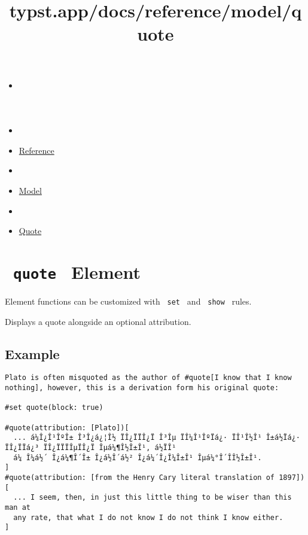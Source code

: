\title{typst.app/docs/reference/model/quote}

\begin{itemize}
\tightlist
\item
  \href{/docs}{}
\item
  
\item
  \href{/docs/reference/}{Reference}
\item
  
\item
  \href{/docs/reference/model/}{Model}
\item
  
\item
  \href{/docs/reference/model/quote/}{Quote}
\end{itemize}

\section{\texorpdfstring{\texttt{\ quote\ } {{ Element
}}}{ quote   Element }}\label{summary}

\label{element-tooltip}
Element functions can be customized with \texttt{\ set\ } and
\texttt{\ show\ } rules.

Displays a quote alongside an optional attribution.

\subsection{Example}\label{example}

\begin{verbatim}
Plato is often misquoted as the author of #quote[I know that I know
nothing], however, this is a derivation form his original quote:

#set quote(block: true)

#quote(attribution: [Plato])[
  ... á¼Î¿Î¹ÎºÎ± Î³Î¿á¿¦Î½ ÏÎ¿ÏÏÎ¿Ï Î³Îµ ÏÎ¼Î¹ÎºÏá¿· ÏÎ¹Î½Î¹ Î±á½Ïá¿· ÏÎ¿ÏÏá¿³ ÏÎ¿ÏÏÏÎµÏÎ¿Ï Îµá¼¶Î½Î±Î¹, á½ÏÎ¹
  á¼ Î¼á½´ Î¿á¼¶Î´Î± Î¿á½Î´á½² Î¿á¼´Î¿Î¼Î±Î¹ Îµá¼°Î´Î­Î½Î±Î¹.
]
#quote(attribution: [from the Henry Cary literal translation of 1897])[
  ... I seem, then, in just this little thing to be wiser than this man at
  any rate, that what I do not know I do not think I know either.
]
\end{verbatim}

